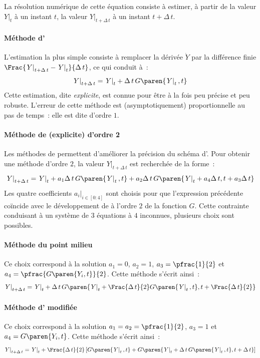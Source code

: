 \documentclass[rectoverso,pleiades,pstricks,leqno,anti]{texmf/note_technique_2010}
\newcommand{\debutpas}[1]{\ensuremath{\left.#1\right|_{t}}}
\newcommand{\finpas}[1]{\ensuremath{\left.#1\right|_{t+\Delta\, t}}}
\begin{document}
La résolution numérique de cette équation consiste à estimer, à partir
de la valeur \(\debutpas{Y}\) à un instant \(t\), la valeur
\(\finpas{Y}\) à un instant \(t+\Delta\, t\).

\paragraph{Méthode d'}
L'estimation la plus simple consiste à remplacer la dérivée
\(\dot{Y}\) par la différence finie
\(\Frac{\finpas{Y}-\debutpas{Y}}{\Delta\, t}\), ce qui conduit à~:
\begin{equation}
  \label{eq:explicite-implicite}
  \finpas{Y}=\debutpas{Y}+\Delta\,t\,G\paren{\debutpas{Y},t}
\end{equation}
Cette estimation, dite {\em explicite}, est connue pour être à la fois
peu précise et peu robuste. L'erreur de cette méthode est
(asymptotiquement) proportionnelle au pas de temps~: elle est dite
d'ordre \(1\).

\paragraph{Méthode de  (explicite) d'ordre 2}
Les méthodes de  permettent d'améliorer la précision
du schéma d'. Pour obtenir une méthode d'ordre \(2\), la
valeur \(\finpas{Y}\) est recherchée de la forme~:
\[
\finpas{Y} = \debutpas{Y}+a_{1}\Delta\,t\,G\paren{\debutpas{Y},t}+a_{2}\Delta\,t\,G\paren{\debutpas{Y}+a_{4}\Delta\, t,t+a_{3}\Delta\,t}
\]
Les quatre coefficients \(\left.a_{i}\right|_{i \in [0:4]}\) sont
choisis pour que l'expression précédente coïncide avec le
développement de  à l'ordre \(2\) de la fonction \(G\).
Cette contrainte conduisant à un système de \(3\) équations à \(4\)
inconnues, plusieurs choix sont possibles.

\paragraph{Méthode du point milieu} Ce choix correspond à la solution
\(a_{1}=0\), \(a_{2}=1\), \(a_{3}=\pfrac{1}{2}\) et
\(a_{4}=\pfrac{G\paren{Y_{i},t}}{2}\). Cette méthode s'écrit ainsi~:
\[
\finpas{Y} = \debutpas{Y}+\Delta\,t\,G\paren{\debutpas{Y}+\Frac{\Delta\, t}{2}G\paren{\debutpas{Y},t},t+\Frac{\Delta\, t}{2}}
\]

\paragraph{Méthode d' modifiée} Ce choix correspond à la solution
\(a_{1}=a_{2}=\pfrac{1}{2}\), \(a_{3}=1\) et
\(a_{4}=G\paren{Y_{i},t}\). Cette méthode s'écrit ainsi~:
\[
\finpas{Y} = \debutpas{Y}+\Frac{\Delta\,t}{2}\left[G\paren{\debutpas{Y},t}+G\paren{\debutpas{Y}+\Delta\, t\,G\paren{\debutpas{Y},t},t+\Delta\,t }\right]
\]
\end{document}

